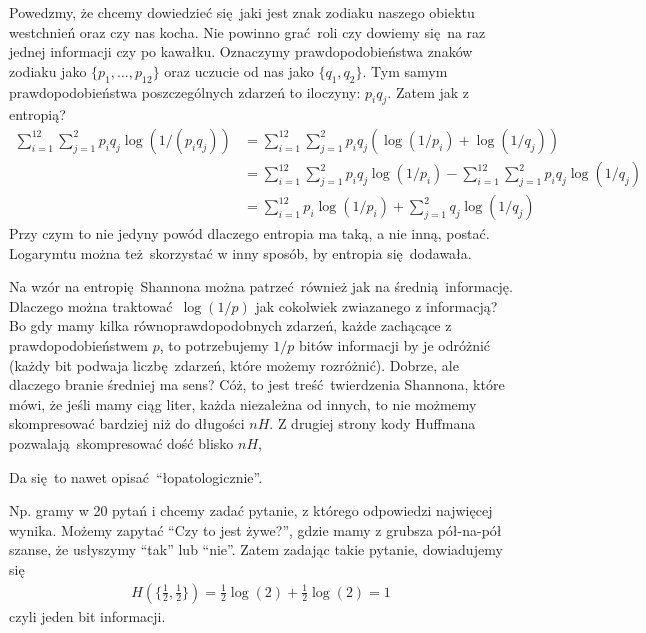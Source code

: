 \documentclass[10pt,a4paper]{article}
\begin{document}
%
Powedzmy, że chcemy dowiedzieć się jaki jest znak zodiaku naszego obiektu westchnień oraz czy nas kocha. Nie powinno grać roli czy dowiemy się na raz jednej informacji czy po kawałku.
Oznaczymy prawdopodobieństwa znaków zodiaku jako $\{p_1, \ldots, p_12 \}$ oraz uczucie od nas jako $\{q_1, q_2\}$. Tym samym prawdopodobieństwa poszczególnych zdarzeń to iloczyny: $p_i q_j$. Zatem jak z entropią?
%
\begin{align}
    \sum_{i=1}^{12} \sum_{j=1}^2 p_i q_j \log(1/(p_i q_j))
    &= \sum_{i=1}^{12} \sum_{j=1}^2 p_i q_j \left( \log(1/p_i) + \log(1/q_j) \right)\\
    &= \sum_{i=1}^{12} \sum_{j=1}^2 p_i q_j \log(1/p_i)
    -\sum_{i=1}^{12} \sum_{j=1}^2 p_i q_j \log(1/q_j)\\
    &= \sum_{i=1}^{12} p_i \log(1/p_i)
    + \sum_{j=1}^2 q_j \log(1/q_j)
\end{align}
%
Przy czym to nie jedyny powód dlaczego entropia ma taką, a nie inną, postać. Logarymtu można też skorzystać w inny sposób, by entropia się dodawała.

Na wzór na entropię Shannona można patrzeć również jak na średnią informację. Dlaczego można traktować $\log(1/p)$ jak cokolwiek zwiazanego z informacją? Bo gdy mamy kilka równoprawdopodobnych zdarzeń, każde zachącące z prawdopodobieństwem $p$, to potrzebujemy $1/p$ bitów informacji by je odróżnić (każdy bit podwaja liczbę zdarzeń, które możemy rozróżnić). Dobrze, ale dlaczego branie średniej ma sens? Cóż, to jest treść twierdzenia Shannona, które mówi, że jeśli mamy ciąg liter, każda niezależna od innych, to nie możmemy skompresować bardziej niż do długości $n H$. Z drugiej strony kody Huffmana pozwalają skompresować dość blisko $n H$,

Da się to nawet opisać ``łopatologicznie''.


Np. gramy w 20 pytań i chcemy zadać pytanie, z którego odpowiedzi najwięcej wynika. Możemy zapytać ``Czy to jest żywe?'', gdzie mamy z grubsza pół-na-pół szanse, że usłyszymy ``tak'' lub ``nie''.  Zatem zadając takie pytanie, dowiadujemy się
\begin{align}
H(\{ \tfrac{1}{2},\tfrac{1}{2}\}) = \tfrac{1}{2} \log(2) + \tfrac{1}{2} \log(2)  = 1
\end{align}
czyli jeden bit informacji. 
\end{document}
